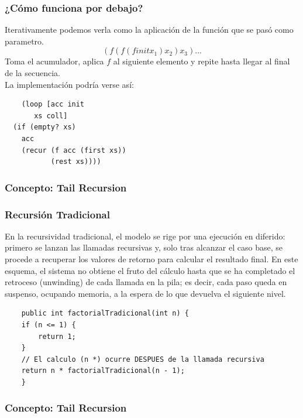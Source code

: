 \documentclass{beamer}
\begin{document}
\begin{frame}[fragile]
\frametitle{¿Cómo funciona por debajo?}
Iterativamente podemos verla como la aplicación de la función que se pasó como parametro.
$$
( f( f(f init x_1 ) x_2 ) x_3) ...
$$
Toma el acumulador, aplica $f$ al siguiente elemento y repite hasta llegar al final de la
secuencia.\\ 
La implementación podría verse así:
\begin{lstlisting}
    (loop [acc init
       xs coll]
  (if (empty? xs)
    acc
    (recur (f acc (first xs))
           (rest xs))))
\end{lstlisting}

\end{frame}

\subsubsection{Concepto: Tail Recursion}
    
\begin{frame}[fragile]
\frametitle{Recursión Tradicional}
En la recursividad tradicional, el modelo se rige por una ejecución en diferido: primero se lanzan las llamadas recursivas y, solo tras alcanzar el caso base, se procede a recuperar los valores de retorno para calcular el resultado final. En este esquema, el sistema no obtiene el fruto del cálculo hasta que se ha completado el retroceso (unwinding) de cada llamada en la pila; es decir, cada paso queda en suspenso, ocupando memoria, a la espera de lo que devuelva el siguiente nivel.
\begin{lstlisting}
    public int factorialTradicional(int n) {
    if (n <= 1) {
        return 1;
    }
    // El calculo (n *) ocurre DESPUES de la llamada recursiva
    return n * factorialTradicional(n - 1);
    }
\end{lstlisting}
\end{frame}
\subsubsection{Concepto: Tail Recursion}
    
\end{document}
